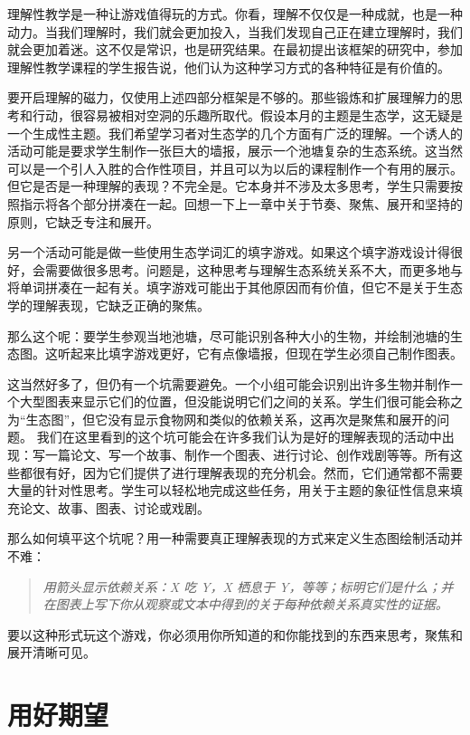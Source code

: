 理解性教学是一种让游戏值得玩的方式。你看，理解不仅仅是一种成就，也是一种动力。当我们理解时，我们就会更加投入，当我们发现自己正在建立理解时，我们就会更加着迷。这不仅是常识，也是研究结果。在最初提出该框架的研究中，参加理解性教学课程的学生报告说，他们认为这种学习方式的各种特征是有价值的。

要开启理解的磁力，仅使用上述四部分框架是不够的。那些锻炼和扩展理解力的思考和行动，很容易被相对空洞的乐趣所取代。假设本月的主题是生态学，这无疑是一个生成性主题。我们希望学习者对生态学的几个方面有广泛的理解。一个诱人的活动可能是要求学生制作一张巨大的墙报，展示一个池塘复杂的生态系统。这当然可以是一个引人入胜的合作性项目，并且可以为以后的课程制作一个有用的展示。但它是否是一种理解的表现？不完全是。它本身并不涉及太多思考，学生只需要按照指示将各个部分拼凑在一起。回想一下上一章中关于节奏、聚焦、展开和坚持的原则，它缺乏专注和展开。

另一个活动可能是做一些使用生态学词汇的填字游戏。如果这个填字游戏设计得很好，会需要做很多思考。问题是，这种思考与理解生态系统关系不大，而更多地与将单词拼凑在一起有关。填字游戏可能出于其他原因而有价值，但它不是关于生态学的理解表现，它缺乏正确的聚焦。

那么这个呢：要学生参观当地池塘，尽可能识别各种大小的生物，并绘制池塘的生态图。这听起来比填字游戏更好，它有点像墙报，但现在学生必须自己制作图表。

这当然好多了，但仍有一个坑需要避免。一个小组可能会识别出许多生物并制作一个大型图表来显示它们的位置，但没能说明它们之间的关系。学生们很可能会称之为“生态图”，但它没有显示食物网和类似的依赖关系，这再次是聚焦和展开的问题。
我们在这里看到的这个坑可能会在许多我们认为是好的理解表现的活动中出现：写一篇论文、写一个故事、制作一个图表、进行讨论、创作戏剧等等。所有这些都很有好，因为它们提供了进行理解表现的充分机会。然而，它们通常都不需要大量的针对性思考。学生可以轻松地完成这些任务，用关于主题的象征性信息来填充论文、故事、图表、讨论或戏剧。

那么如何填平这个坑呢？用一种需要真正理解表现的方式来定义生态图绘制活动并不难：
\begin{quotation}
    \textit{用箭头显示依赖关系：X 吃 Y，X 栖息于 Y，等等；标明它们是什么；并在图表上写下你从观察或文本中得到的关于每种依赖关系真实性的证据。}
\end{quotation}

要以这种形式玩这个游戏，你必须用你所知道的和你能找到的东西来思考，聚焦和展开清晰可见。

\section*{用好期望}

